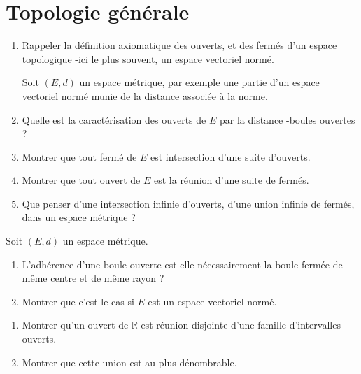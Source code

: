 \section{Topologie g\'en\'erale}

\begin{exer}
\begin{enumerate}
\item Rappeler la définition axiomatique des ouverts, et des fermés d'un espace topologique -ici le plus souvent, un espace vectoriel normé.

\smallskip
Soit $(E,d)$ un espace métrique, par exemple une partie d'un espace vectoriel normé munie de la distance associée à la norme.
\item Quelle est la caractérisation des ouverts de $E$ par la distance -boules ouvertes ?
\item Montrer que tout fermé de $E$ est intersection d'une suite d'ouverts.
\item Montrer que tout ouvert de $E$ est la réunion d'une suite de fermés.
\item Que penser d'une intersection infinie d'ouverts, d'une union infinie de fermés, dans un espace métrique ?
\end{enumerate}
\end{exer}

\begin{exer}
Soit $(E,d)$ un espace métrique.
\begin{enumerate}
\item L'adhérence d'une boule ouverte est-elle nécessairement la boule fermée de même centre et de même rayon ?
\item Montrer que c'est le cas si $E$ est un espace vectoriel normé.
\end{enumerate}
\end{exer}

\begin{exer}
\begin{enumerate}
\item Montrer qu'un ouvert de $\mathbb{R}$ est réunion disjointe d'une famille d'intervalles ouverts.
\item Montrer que cette union est au plus dénombrable.
\end{enumerate}
\end{exer}


